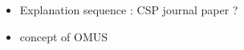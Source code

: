 
\begin{itemize}
    \item Explanation sequence : CSP journal paper ?
    \item concept of OMUS
\end{itemize}